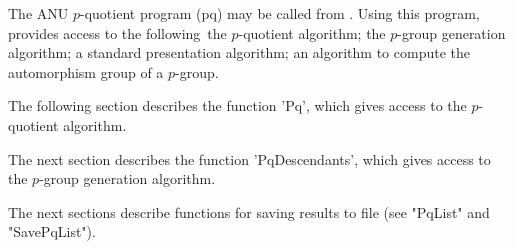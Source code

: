 
The ANU $p$-quotient program (pq) may  be called from {\GAP}.  Using this
program,  {\GAP}  provides access to   the  following\:\ the $p$-quotient
algorithm;  the $p$-group  generation algorithm; a  standard presentation
algorithm; an algorithm to compute the automorphism group of a $p$-group.

The  following section describes the function 'Pq', which gives access to
the $p$-quotient algorithm.

The next section  describes  the  function 'PqDescendants',  which  gives
access to the $p$-group generation algorithm.

The next sections describe  functions for  saving  results  to  file (see
"PqList" and "SavePqList").

